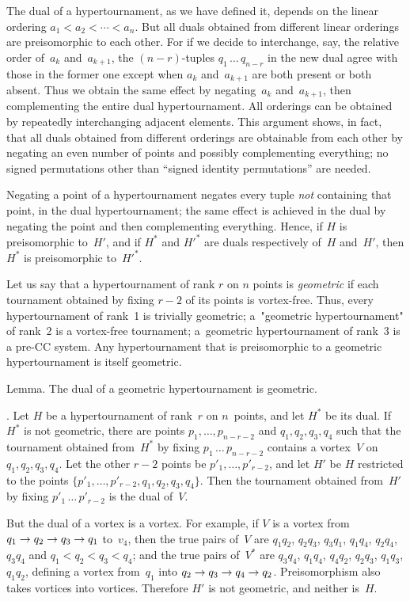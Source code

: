 The dual of a hypertournament, as we have defined it, depends on the
linear ordering $a_1<a_2<\cdots <a_n$. But all duals obtained from
different linear orderings are preisomorphic to each other. For if we
decide to interchange, say, the relative order of~$a_k$ and~$a_{k+1}$,
the $(n-r)$-tuples $q_1\,\ldots\,q_{n-r}$ in the new dual agree with
those in the former one except when $a_k$ and~$a_{k+1}$ are both
present or both absent. Thus we obtain the same effect by
negating~$a_k$ and~$a_{k+1}$, then complementing the entire dual
hypertournament. All orderings can be obtained by repeatedly
interchanging adjacent elements. This argument shows, in fact, that
all duals obtained from different orderings are obtainable from each
other by negating an even number of points and possibly complementing
everything; no signed permutations other than ``signed identity
permutations'' are needed.

Negating a point of a hypertournament negates every tuple {\it not\/}
containing that point, in the dual hypertournament; the same effect is
achieved in the dual by negating the point and then complementing
everything. Hence, if $H$ is preisomorphic to~$H'$, and if $H^{\ast}$
and $H'^{\ast}$ are duals respectively of~$H$ and~$H'$, then
$H^{\ast}$ is preisomorphic to~$H'^{\ast}$.

Let us say that a hypertournament of rank $r$ on $n$ points is {\it
geometric\/} if each tournament obtained by fixing $r-2$ of its
points is vortex-free. Thus, every hypertournament of rank~1 is
trivially geometric; a~"geometric hypertournament" of rank~2 is a
vortex-free tournament; a~geometric hypertournament of rank~3 is a
pre-CC system. Any hypertournament that is preisomorphic to a
geometric hypertournament is itself geometric.

\proclaim Lemma. The dual of a geometric hypertournament is geometric.

.\quad
Let $H$ be a hypertournament of rank~$r$ on $n$~points, and let
$H^{\ast}$ be its dual. If $H^{\ast}$ is not geometric, there are
points $p_1,\ldots,p_{n-r-2}$ and $q_1,q_2,q_3,q_4$ such that the
tournament obtained from~$H^{\ast}$ by fixing $p_1\,\ldots\,p_{n-r-2}$
contains a vortex~$V$ on $q_1,q_2,q_3,q_4$. Let the other $r-2$ points
be $p'_1,\ldots,p'_{r-2}$, and let $H'$ be $H$ restricted to the
points $\{p'_1,\ldots,p'_{r-2},q_1,q_2,q_3,q_4\}$. Then the tournament
obtained from~$H'$ by fixing $p'_1\,\ldots\,p'_{r-2}$ is the dual
of~$V$.

But the dual of a vortex is a vortex. For example, if $V$ is a vortex
from $q_1\rightarrow q_2\rightarrow q_3\rightarrow q_1$ to~$v_4$, then the true pairs of~$V$
are $q_1q_2$, $q_2q_3$, $q_3q_1$, $q_1q_4$, $q_2q_4$, $q_3q_4$ and
$q_1<q_2<q_3<q_4$; and the true pairs of~$V^{\ast}$ are $q_3q_4$,
$q_1q_4$, $q_4q_2$, $q_2q_3$, $q_1q_3$, $q_1q_2$, defining a vortex
from~$q_1$ into $q_2\rightarrow q_3\rightarrow q_4\rightarrow q_2$. 
Preisomorphism also takes vortices into vortices.
Therefore $H'$ is not
geometric, and neither is~$H$.\quad\pfbox

